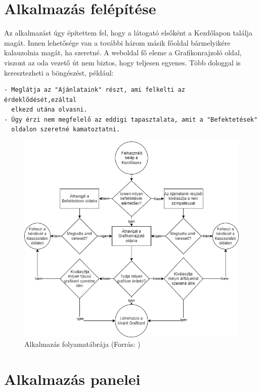 
\section{Alkalmazás felépítése}

Az alkalmazást úgy építettem fel, hogy a látogató elsőként a Kezdőlapon találja magát. Innen lehetősége van a további három másik főoldal bármelyikére kalauzolnia magát, ha szeretné. A weboldal fő eleme a Grafikonrajzoló oldal, viszont az oda vezető út nem biztos, hogy teljesen egyenes. Több dologgal is keresztezheti a böngészést, például:

\begin{verbatim}
- Meglátja az "Ajánlataink" részt, ami felkelti az érdeklődését,ezáltal 
  elkezd utána olvasni.
- Úgy érzi nem megfelelő az eddigi tapasztalata, amit a "Befektetések" 
  oldalon szeretné kamatoztatni.
\end{verbatim}

\begin{figure}[h]
\centering
\includegraphics[scale=0.5]{images/flowchart.png}
\caption{Alkalmazás folyamatábrája (Forrás: \cite{draw})}
\label{fig:draw}
\end{figure}

\section{Alkalmazás panelei}

